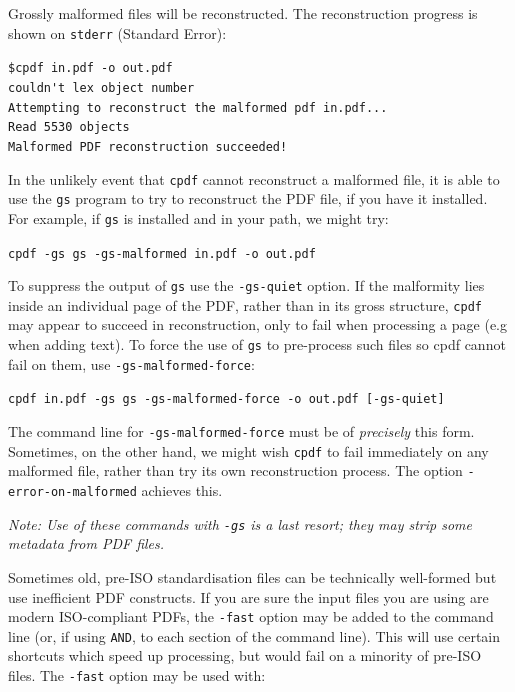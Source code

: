 \documentclass{book}
\begin{document}
Grossly malformed files will be reconstructed. The reconstruction
progress is shown on \verb!stderr! (Standard Error):

\begin{framed}
\noindent\small\verb!$cpdf in.pdf -o out.pdf!\\
\small\verb!couldn't lex object number!\\
\small\verb!Attempting to reconstruct the malformed pdf in.pdf...!\\
\small\verb!Read 5530 objects!\\
\small\verb$Malformed PDF reconstruction succeeded!$
\end{framed}

\noindent In the unlikely event that \texttt{cpdf} cannot reconstruct a malformed file, it is able to use the \texttt{gs} program to try to reconstruct the PDF file, if you have it installed. For example, if \texttt{gs} is installed and in your path, we might try:

\begin{framed}
\noindent\small\verb!cpdf -gs gs -gs-malformed in.pdf -o out.pdf!\end{framed}

\noindent To suppress the output of \texttt{gs} use the \texttt{-gs-quiet} option. If the malformity lies inside an individual page of the PDF, rather than in its gross structure, \texttt{cpdf} may appear to succeed in reconstruction, only to fail when processing a page (e.g when adding text). To force the use of \texttt{gs} to pre-process such files so cpdf cannot fail on them, use \texttt{-gs\--malformed\--force}:

\begin{framed}
\noindent\small\verb!cpdf in.pdf -gs gs -gs-malformed-force -o out.pdf [-gs-quiet]!\end{framed}

\noindent The command line for \texttt{-gs-malformed-force} must be of \textit{precisely} this form. Sometimes, on the other hand, we might wish \texttt{cpdf} to fail immediately on any malformed file, rather than try its own reconstruction process. The option \texttt{-error-on-malformed} achieves this.


\begin{framed}\noindent\textit{Note: Use of these commands with \texttt{-gs} is a last resort; they may strip some metadata from PDF files.}\end{framed}

\noindent Sometimes old, pre-ISO standardisation files can be technically well-formed but use inefficient PDF constructs.  If you are sure the input files you are using are
modern ISO-compliant PDFs, the \texttt{-fast} option may be added to the command line (or, if
using \texttt{AND}, to each section of the command line). This will use certain
shortcuts which speed up processing, but would fail on a minority of pre-ISO files. The \verb!-fast! option may be used with:
\end{document}
